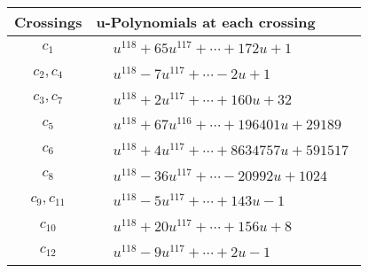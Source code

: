 \documentclass[1p]{elsarticle_modified}
\theoremstyle{definition}
\begin{document}
\begin{tabular}{m{50pt}|m{274pt}}
Crossings & \hspace{64pt}u-Polynomials at each crossing \\
\hline $$\begin{aligned}c_{1}\end{aligned}$$&$\begin{aligned}
&u^{118}+65 u^{117}+\cdots+172 u+1
\end{aligned}$\\
\hline $$\begin{aligned}c_{2},c_{4}\end{aligned}$$&$\begin{aligned}
&u^{118}-7 u^{117}+\cdots-2 u+1
\end{aligned}$\\
\hline $$\begin{aligned}c_{3},c_{7}\end{aligned}$$&$\begin{aligned}
&u^{118}+2 u^{117}+\cdots+160 u+32
\end{aligned}$\\
\hline $$\begin{aligned}c_{5}\end{aligned}$$&$\begin{aligned}
&u^{118}+67 u^{116}+\cdots+196401 u+29189
\end{aligned}$\\
\hline $$\begin{aligned}c_{6}\end{aligned}$$&$\begin{aligned}
&u^{118}+4 u^{117}+\cdots+8634757 u+591517
\end{aligned}$\\
\hline $$\begin{aligned}c_{8}\end{aligned}$$&$\begin{aligned}
&u^{118}-36 u^{117}+\cdots-20992 u+1024
\end{aligned}$\\
\hline $$\begin{aligned}c_{9},c_{11}\end{aligned}$$&$\begin{aligned}
&u^{118}-5 u^{117}+\cdots+143 u-1
\end{aligned}$\\
\hline $$\begin{aligned}c_{10}\end{aligned}$$&$\begin{aligned}
&u^{118}+20 u^{117}+\cdots+156 u+8
\end{aligned}$\\
\hline $$\begin{aligned}c_{12}\end{aligned}$$&$\begin{aligned}
&u^{118}-9 u^{117}+\cdots+2 u-1
\end{aligned}$\\
\hline
\end{tabular}\\~\\
\end{document}
